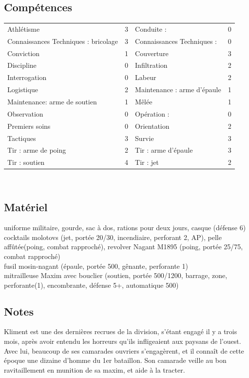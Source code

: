 \documentclass{report}
\begin{document}
\subsection*{Compétences}
\begin{tabular}{p{}| r || p{}| r|}
Athlétisme & 3&Conduite : & 0\\
Connaissances Techniques : bricolage& 3 &Connaissances Techniques : & 0\\
Conviction & 1 &Couverture& 3\\
Discipline & 0 &Infiltration& 2\\
Interrogation &0 & Labeur& 2\\
Logistique &2 & Maintenance : arme d'épaule& 1\\
Maintenance: arme de soutien &1 & Mêlée& 1\\
Observation &0 & Opération : & 0\\
Premiers soins &0 & Orientation& 2\\
 Tactiques &3 & Survie& 3\\
Tir : arme de poing &2 & Tir : arme d'épaule & 3\\
Tir : soutien &4 & Tir : jet& 2\\
\end{tabular}\\
\noindent\makebox[\linewidth]{\rule{\textwidth}{0.4pt}}
\subsection*{Matériel}
uniforme militaire, gourde, sac à dos, rations pour deux jours, casque (défense 6)\\
cocktails molotovs (jet, portée 20/30, incendiaire, perforant 2, AP), pelle affûtée(poing, combat rapproché), revolver Nagant M1895 (poing, portée 25/75, combat rapproché)\\
fusil mosin-nagant (épaule, portée 500, gênante, perforante 1) \\
mitrailleuse Maxim avec bouclier (soutien, portée 500/1200, barrage, zone, perforante(1), encombrante, défense 5+, automatique 500)\\
\noindent\makebox[\linewidth]{\rule{\textwidth}{0.4pt}}
\subsection*{Notes}
Kliment est une des dernières recrues de la division, s'étant engagé il y a trois mois, après avoir entendu les horreurs qu'ils infligeaient aux paysans de l'ouest. Avec lui, beaucoup de ses camarades ouvriers s'engagèrent, et il connaît de cette époque une dizaine d'homme du 1er bataillon. Son camarade veille au bon ravitaillement en munition de sa maxim, et aide à la tracter.
\rmfamily
\end{document}
